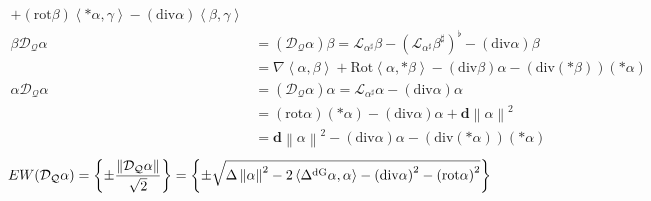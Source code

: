 \documentclass[a4paper,10pt]{scrartcl}
\newcommand{\exd}{\mathbf{d}}
\newcommand{\rot}{\mathrm{rot}}
\renewcommand{\div}{\mathrm{div}}
\newcommand{\Rot}{\mathrm{Rot}}
\newcommand{\lie}{\mathcal{L}}
\newcommand{\dq}{\mathcal{D}_{\mathcal{Q}}}
\newcommand{\laplace}[1]{\Delta^{#1}}
\newcommand{\ldivgrad}{\laplace{\textup{dG}}}
\begin{document}
\begin{align*}
             +(\rot\beta)\left\langle *\alpha,\gamma \right\rangle
             -(\div\alpha)\left\langle \beta, \gamma \right\rangle\\
    \beta\dq\alpha &= \left( \dq\alpha \right)\beta = \lie_{\alpha^{\sharp}}\beta - \left( \lie_{\alpha^{\sharp}}\beta^{\sharp} \right)^{\flat} - \left( \div\alpha \right)\beta\\
                   &= \nabla\left\langle \alpha, \beta \right\rangle + \Rot\left\langle \alpha , *\beta \right\rangle
                        - \left( \div\beta \right)\alpha - \left(\div\left(*\beta\right)\right)\left(*\alpha\right) \\
    \alpha\dq\alpha &= \left( \dq\alpha \right)\alpha = \lie_{\alpha^{\sharp}}\alpha - \left( \div\alpha \right)\alpha\\
                    &= \left( \rot\alpha \right)\left( *\alpha \right) - \left( \div\alpha \right)\alpha +\exd\left\| \alpha \right\|^{2}\\
                    &= \exd\left\| \alpha \right\|^{2} -  \left( \div\alpha \right)\alpha -  \left( \div\left( *\alpha \right)\right)\left( *\alpha \right)
  \end{align*}
  \begin{align*}
    EW(\dq\alpha) &= \left\{ \pm \frac{\left\| \dq\alpha \right\|}{\sqrt{2}} \right\}
           =\left\{ \pm \sqrt{\Delta\left\| \alpha \right\|^{2} - 2\left\langle \ldivgrad\alpha , \alpha \right\rangle 
                                  -\left( \div\alpha \right)^{2} - \left( \rot\alpha \right)^{2}} \right\}
  \end{align*}
\end{document}
